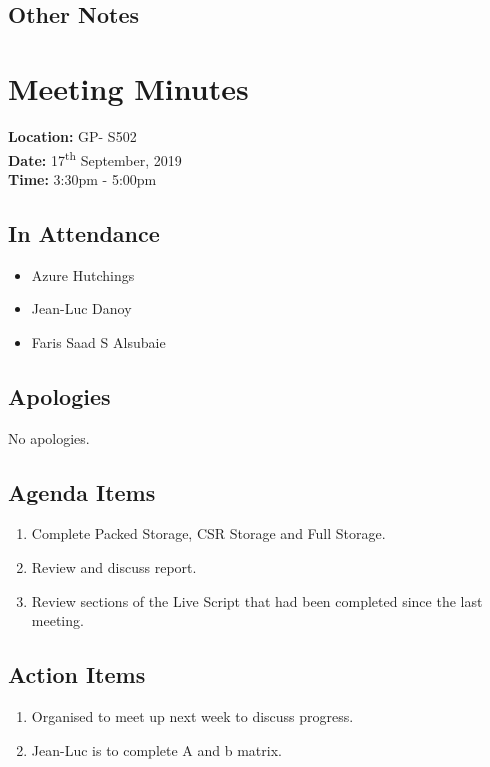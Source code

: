 \documentclass{article}
\begin{document}
\subsection*{Other Notes}

\pagebreak

\section{Meeting Minutes}
\textbf{Location:} GP- S502 \\
\textbf{Date:} 17\textsuperscript{th} September, 2019 \\
\textbf{Time:} 3:30pm - 5:00pm

\subsection*{In Attendance}
\begin{itemize}
\item Azure Hutchings
\item Jean-Luc Danoy
\item Faris Saad S Alsubaie
\end{itemize}

\subsection*{Apologies}
No apologies. 

\subsection*{Agenda Items}
\begin{enumerate}
\item Complete Packed Storage, CSR Storage and Full Storage.
\item Review and discuss report.
\item Review sections of the Live Script that had been completed since the last meeting.
\ 
\end{enumerate}

\subsection*{Action Items}
\begin{enumerate}
\item Organised to meet up next week to discuss progress.
\item Jean-Luc is to complete A and b matrix.
\end{enumerate}
\end{document}
